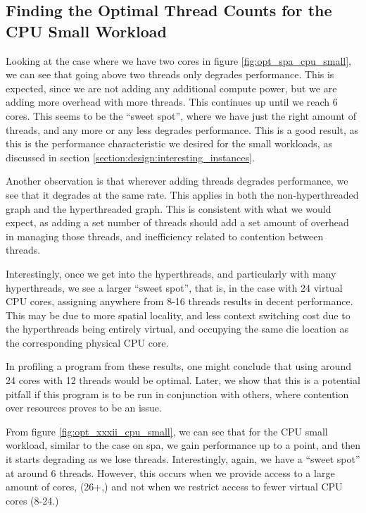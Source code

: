 \subsection{Finding the Optimal Thread Counts for the CPU Small Workload}
\label{section:results:finding_the_optimal_thread_couonts_for_the_cpu_small_workload}

Looking at the case where we have two cores in figure \ref{fig:opt_spa_cpu_small}, we can see that going above two threads only degrades performance. This is expected, since we are not adding any additional compute power, but we are adding more overhead with more threads. This continues up until we reach 6 cores. This seems to be the ``sweet spot'', where we have just the right amount of threads, and any more or any less degrades performance. This is a good result, as this is the performance characteristic we desired for the small workloads, as discussed in section \ref{section:design:interesting_instances}.

Another observation is that wherever adding threads degrades performance, we see that it degrades at the same rate. This applies in both the non-hyperthreaded graph and the hyperthreaded graph. This is consistent with what we would expect, as adding a set number of threads should add a set amount of overhead in managing those threads, and inefficiency related to contention between threads.

Interestingly, once we get into the hyperthreads, and particularly with many hyperthreads, we see a larger ``sweet spot'', that is, in the case with 24 virtual CPU cores, assigning anywhere from 8-16 threads results in decent performance. This may be due to more spatial locality, and less context switching cost due to the hyperthreads being entirely virtual, and occupying the same die location as the corresponding physical CPU core.

In profiling a program from these results, one might conclude that using around 24 cores with 12 threads would be optimal. Later, we show that this is a potential pitfall if this program is to be run in conjunction with others, where contention over resources proves to be an issue.



From figure \ref{fig:opt_xxxii_cpu_small}, we can see that for the CPU small workload, similar to the case on spa, we gain performance up to a point, and then it starts degrading as we lose threads. Interestingly, again, we have a ``sweet spot'' at around 6 threads. However, this occurs when we provide access to a large amount of cores, (26+,) and not when we restrict access to fewer virtual CPU cores (8-24.)

